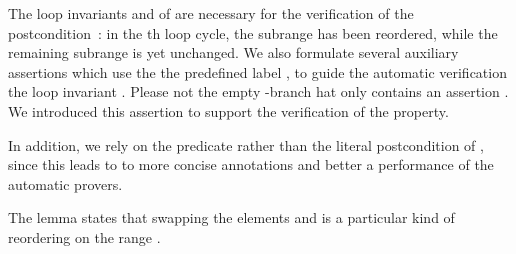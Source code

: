 

The loop invariants  and  of \shuffle 
are necessary for the verification of the postcondition~:
in the th loop cycle, the subrange  has been
reordered, while the remaining subrange  is yet unchanged.
We also formulate several auxiliary assertions  which use the
the predefined label ,
to guide the automatic verification the loop invariant .
Please not the empty -branch hat only contains an assertion .
We introduced this assertion to support the verification of the  property.


\clearpage

In addition, we rely on the predicate 
rather than the literal postcondition of , since this leads to
to more concise annotations and better a performance of the automatic provers.



The lemma  states that swapping the elements
 and  is a particular
kind of reordering on the range .



\clearpage

